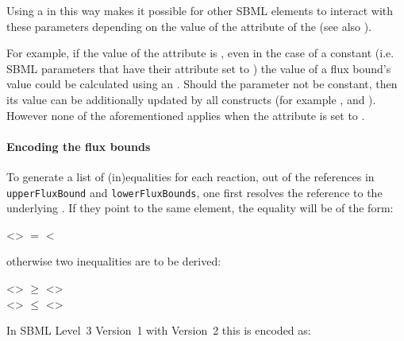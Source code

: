 Using a \Parameter in this way makes it possible for other SBML elements to interact with these parameters depending on the value of the  attribute of the \Model (see also ).

For example, if the value of the  attribute is , even in the case of a constant \Parameter (i.e. SBML parameters that have their
 attribute set to ) the value of a flux bound's value could be calculated using an \InitialAssignment. Should the parameter not be constant, then its value can be additionally updated by all \sbmlthreecore constructs (for example \EventAssignment, \AssignmentRule and \AlgebraicRule). However none of the aforementioned applies when the  attribute is set to .


\paragraph{Encoding the flux bounds}
To generate a list of (in)equalities for each reaction, out of the references
in \texttt{upperFluxBound} and \texttt{lowerFluxBounds}, one first resolves the
reference to the underlying \Parameter
. If they point to the same element, the equality will be of the form:

<> $=$ <

otherwise two inequalities are to be derived:

<> $\geq$ <>\\
<> $\leq$ <>

In SBML Level~3 Version~1 with \FBC Version~2 this is encoded as:
%

%
%
%


